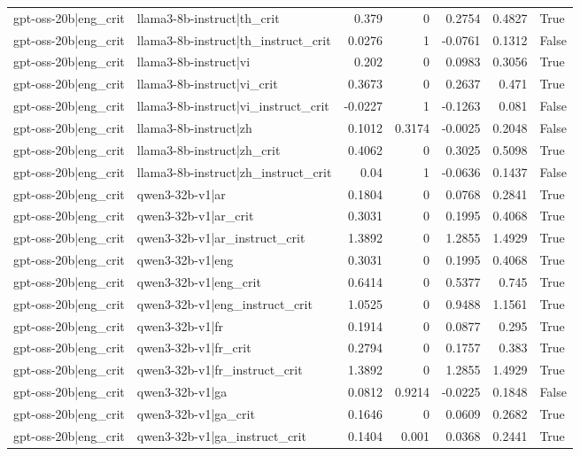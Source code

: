 \begin{table}
\begin{tabular}{l l r r r r l}
gpt-oss-20b|eng_crit & llama3-8b-instruct|th_crit & 0.379 & 0 & 0.2754 & 0.4827 & True \\
gpt-oss-20b|eng_crit & llama3-8b-instruct|th_instruct_crit & 0.0276 & 1 & -0.0761 & 0.1312 & False \\
gpt-oss-20b|eng_crit & llama3-8b-instruct|vi & 0.202 & 0 & 0.0983 & 0.3056 & True \\
gpt-oss-20b|eng_crit & llama3-8b-instruct|vi_crit & 0.3673 & 0 & 0.2637 & 0.471 & True \\
gpt-oss-20b|eng_crit & llama3-8b-instruct|vi_instruct_crit & -0.0227 & 1 & -0.1263 & 0.081 & False \\
gpt-oss-20b|eng_crit & llama3-8b-instruct|zh & 0.1012 & 0.3174 & -0.0025 & 0.2048 & False \\
gpt-oss-20b|eng_crit & llama3-8b-instruct|zh_crit & 0.4062 & 0 & 0.3025 & 0.5098 & True \\
gpt-oss-20b|eng_crit & llama3-8b-instruct|zh_instruct_crit & 0.04 & 1 & -0.0636 & 0.1437 & False \\
gpt-oss-20b|eng_crit & qwen3-32b-v1|ar & 0.1804 & 0 & 0.0768 & 0.2841 & True \\
gpt-oss-20b|eng_crit & qwen3-32b-v1|ar_crit & 0.3031 & 0 & 0.1995 & 0.4068 & True \\
gpt-oss-20b|eng_crit & qwen3-32b-v1|ar_instruct_crit & 1.3892 & 0 & 1.2855 & 1.4929 & True \\
gpt-oss-20b|eng_crit & qwen3-32b-v1|eng & 0.3031 & 0 & 0.1995 & 0.4068 & True \\
gpt-oss-20b|eng_crit & qwen3-32b-v1|eng_crit & 0.6414 & 0 & 0.5377 & 0.745 & True \\
gpt-oss-20b|eng_crit & qwen3-32b-v1|eng_instruct_crit & 1.0525 & 0 & 0.9488 & 1.1561 & True \\
gpt-oss-20b|eng_crit & qwen3-32b-v1|fr & 0.1914 & 0 & 0.0877 & 0.295 & True \\
gpt-oss-20b|eng_crit & qwen3-32b-v1|fr_crit & 0.2794 & 0 & 0.1757 & 0.383 & True \\
gpt-oss-20b|eng_crit & qwen3-32b-v1|fr_instruct_crit & 1.3892 & 0 & 1.2855 & 1.4929 & True \\
gpt-oss-20b|eng_crit & qwen3-32b-v1|ga & 0.0812 & 0.9214 & -0.0225 & 0.1848 & False \\
gpt-oss-20b|eng_crit & qwen3-32b-v1|ga_crit & 0.1646 & 0 & 0.0609 & 0.2682 & True \\
gpt-oss-20b|eng_crit & qwen3-32b-v1|ga_instruct_crit & 0.1404 & 0.001 & 0.0368 & 0.2441 & True \\

\end{tabular}
\end{table}
